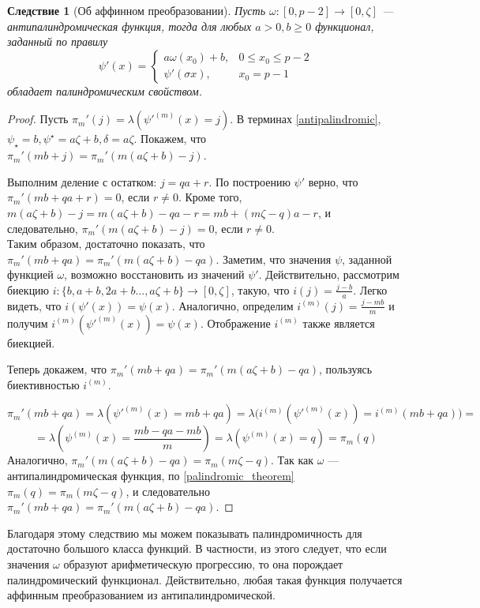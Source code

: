\documentclass[14pt, a4paper, russian]{report}
\newtheorem{corollary}{\indent Следствие}
\begin{document}
\begin{corollary}[Об аффинном преобразовании]
Пусть $\omega:[0,p-2] \rightarrow [0, \zeta]$ --- антипалиндромическая функция, тогда для любых $a > 0, b \ge 0$ функционал, заданный по правилу
$$\psi'(x) = \begin{cases}
                    a \omega(x_0) + b, & 0 \le x_0 \le p - 2 \\
                    \psi'(\sigma x), & x_0 = p - 1
                \end{cases}$$
обладает палиндромическим свойством.
\end{corollary}
\begin{proof}
Пусть $\pi_m'(j) = \lambda(\psi'^{(m)}(x)=j)$. В терминах \cref{antipalindromic}, $\psi_\star = b, \psi^\star = a\zeta + b, \delta = a\zeta$. Покажем, что $\pi_m'(mb + j) = \pi_m' (m(a\zeta+b)-j)$.

Выполним деление с остатком: $j = qa + r$. По построению $\psi'$ верно, что $\pi_m'(mb + qa + r) = 0$, если $r \ne 0$. Кроме того, $m(a\zeta+b)-j = m(a\zeta+b)-qa - r = mb + (m\zeta -q)a - r$, и следовательно, $\pi_m' (m(a\zeta+b)-j) = 0$, если $r \ne 0$.\\
Таким образом, достаточно показать, что $\pi_m'(mb + qa) = \pi_m' (m(a\zeta+b)-qa)$.
Заметим, что значения $\psi$, заданной функцией $\omega$, возможно восстановить из значений $\psi'$. Действительно, рассмотрим биекцию $i: \{b, a + b, 2a + b \ldots, a\zeta + b\} \rightarrow [0, \zeta]$, такую, что $i(j) = \frac{j-b}{a}$. Легко видеть, что $i(\psi'(x))=\psi(x)$. Аналогично, определим $i^{(m)}(j) = \frac{j-mb}{m}$ и получим $i^{(m)}(\psi'^{(m)}(x))=\psi(x)$. Отображение $i^{(m)}$ также является биекцией.

Теперь докажем, что $\pi_m'(mb + qa) = \pi_m' (m(a\zeta+b)-qa)$, пользуясь биективностью $i^{(m)}$.

\[\pi_m'(mb + qa) = \lambda(\psi'^{(m)}(x)=mb + qa) = \lambda\big(i^{(m)}(\psi'^{(m)}(x))=i^{(m)}(mb + qa)\big)  =\]\[= \lambda(\psi^{(m)}(x)= \frac{mb-qa-mb}{m})= \lambda(\psi^{(m)}(x)= q)=\pi_m(q)\]
Аналогично, $\pi_m' (m(a\zeta+b)-qa) = \pi_m(m\zeta - q)$. Так как $\omega$ --- антипалиндромическая функция, по \cref{palindromic_theorem} $\pi_m(q) = \pi_m(m \zeta - q)$, и следовательно $\pi_m'(mb + qa) = \pi_m' (m(a\zeta+b)-qa)$.
\end{proof}

Благодаря этому следствию мы можем показывать палиндромичность для достаточно большого класса функций. В частности, из этого следует, что если значения $\omega$ образуют арифметическую прогрессию, то она порождает палиндромический функционал. Действительно, любая такая функция получается аффинным преобразованием из антипалиндромической.
\end{document}
